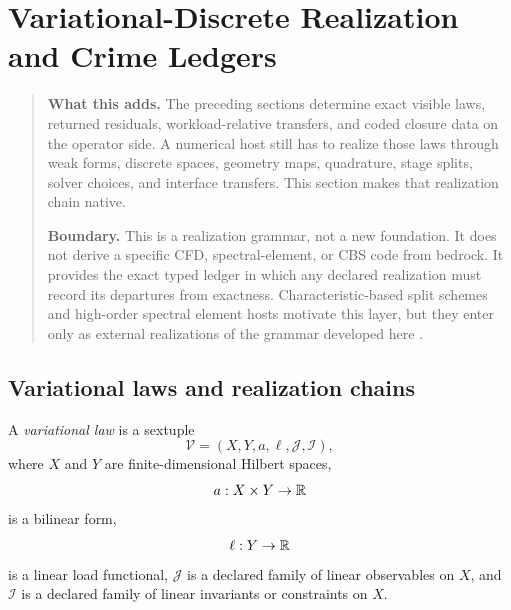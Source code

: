 \section{Variational-Discrete Realization and Crime Ledgers}
\label{sec:realization-calculus}

\begin{quote}\small
\textbf{What this adds.}
The preceding sections determine exact visible laws, returned residuals,
workload-relative transfers, and coded closure data on the operator side. A
numerical host still has to realize those laws through weak forms, discrete
spaces, geometry maps, quadrature, stage splits, solver choices, and interface
transfers. This section makes that realization chain native.

\smallskip\noindent
\textbf{Boundary.}
This is a realization grammar, not a new foundation. It does not derive a
specific CFD, spectral-element, or CBS code from bedrock. It provides the
exact typed ledger in which any declared realization must record its departures
from exactness. Characteristic-based split schemes and high-order spectral
element hosts motivate this layer, but they enter only as external
realizations of the grammar developed here
\cite{NithiarasuCodinaZienkiewicz2006,Nek5000Theory2026,Nek5000CaseFiles2026,Nek5000Filters2026,NekNekTutorial2026}.
\end{quote}

\subsection{Variational laws and realization chains}

\begin{definition}
\label{def:variational-law}
A \emph{variational law} is a sextuple
\[
\mathcal V=(X,Y,a,\ell,\mathcal J,\mathcal I),
\]
where \(X\) and \(Y\) are finite-dimensional Hilbert spaces,
\[
a:X\times Y\to \mathbb{R}
\]
is a bilinear form,
\[
\ell:Y\to \mathbb{R}
\]
is a linear load functional,
\(\mathcal J\) is a declared family of linear observables on \(X\), and
\(\mathcal I\) is a declared family of linear invariants or constraints on
\(X\).
\end{definition}

